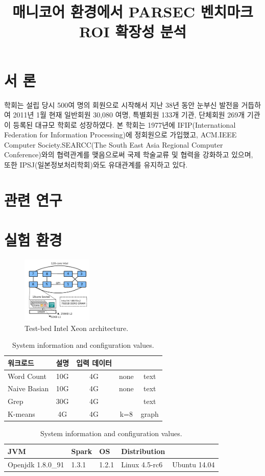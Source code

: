 \documentclass{kcc}
\title{매니코어 환경에서 PARSEC 벤치마크 ROI 확장성 분석}
\author{
}
\begin{document}
\maketitle


\section{서 론}
학회는 설립 당시 500여 명의 회원으로 시작해서 지난 38년 동안 눈부신 발전을 거듭하여 
2011년 1월 현재 일반회원 30,080 여명, 특별회원 133개 기관, 단체회원 269개 기관이 등록된 대규모 학회로 성장하였다. 
본 학회는 1977년에 IFIP(International Federation for Information Processing)에 정회원으로 가입했고, 
ACM.IEEE Computer Society.SEARCC(The South East Asia Regional Computer Conference)와의 협력관계를 맺음으로써 
국제 학술교류 및 협력을 강화하고 있으며, 또한 IPSJ(일본정보처리학회)와도 유대관계를 유지하고 있다.


\section{관련 연구}


\section{실험 환경}

\begin{figure}[h]
  \begin{center}
     \includegraphics[width=0.3\textwidth]{fig/xeon}
  \end{center}
  \caption{Test-bed Intel Xeon architecture.}
  \label{fig:basic}
\end{figure}


\begin{table}[h!]
  \centering
  \small
  \begin{tabular}{l c c c c} \toprule
    워크로드 & 설명 & 입력 데이터\\
    \midrule
    Word Count & 10G & 4G & none & text \\ 
    Naive Basian & 10G & 4G & none & text\\
    Grep & 30G & 4G &  & text\\
    K-means & 4G & 4G & k=8 & graph\\
    \bottomrule
  \end{tabular}
  
  \begin{tabular}{l l l l l} \toprule
    JVM & Spark & OS & Distribution\\
    \midrule
    Openjdk 1.8.0\_91 & 1.3.1 & 1.2.1 & Linux 4.5-rc6 & Ubuntu 14.04\\ 
    \bottomrule
  \end{tabular}
  \caption{System information and configuration values.}
  \label{tab:memuse}
\end{table}
\end{document}
